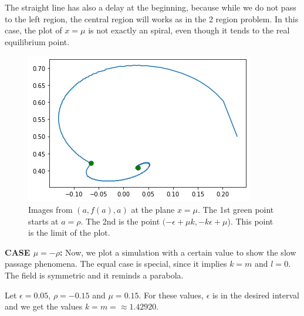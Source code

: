 \documentclass[a4paper,preprint,11pt]{article}
\begin{document}
The straight line  has also a delay at the beginning, because while we do not pass to the left region, the central region will works as in the 2 region problem. In this case, the plot of $x=\mu$ is not exactly an spiral, even though it tends to the real equilibrium point.

\begin{figure}[h]
    \centering
    \includegraphics[scale=0.6]{Slow_Passage/NewSpiral.png}
    \caption{Images from $(a,f(a),a)$ at the plane $x=\mu$. The 1st green point starts at $a=\rho$. The 2nd is the point $(-\epsilon+\mu k, -k\epsilon+\mu$). This point is the limit of the plot.}
    \label{fig:new.spiral}
\end{figure}



\textbf{CASE \boldmath$\mu=-\rho$:} Now, we plot a simulation with a certain value to show the slow passage phenomena. The equal case is special, since it implies $k=m$ and $l=0$. The field is symmetric and it reminds a parabola. 

Let $\epsilon = 0.05$, $\rho = -0.15$ and $\mu = 0.15$. For these values, $\epsilon$ is in the desired interval and we get the values $k=m=\approx 1.42920$.
\end{document}
